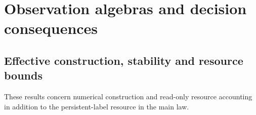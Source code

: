 \section{Observation algebras and decision consequences}
\label{app:decisions}
\begingroup
\let\section\subsection
\let\subsection\subsubsection
\let\subsubsection\paragraph




\endgroup
\section{Effective construction, stability and resource bounds}
\label{app:effective}
These results concern numerical construction and read-only resource
accounting in addition to the persistent-label resource in the main law.
\begingroup
\let\section\subsection
\let\subsection\subsubsection
\let\subsubsection\paragraph





\endgroup

